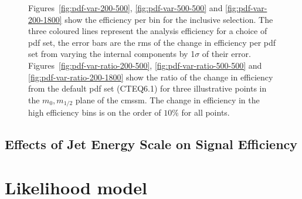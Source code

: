\begin{figure}[!h]
  \begin{center}
    \caption{Figures~\ref{fig:pdf-var-200-500}, \ref{fig:pdf-var-500-500} and 
    \ref{fig:pdf-var-200-1800} show the efficiency per \HT bin for the 
    inclusive selection. The three coloured lines represent the analysis 
    efficiency for a choice of \ac{pdf} set, the error bars are the \ac{rms} of 
    the change in efficiency per \ac{pdf} set from varying the internal 
    components by 1$\sigma$ of their error. 
    Figures~\ref{fig:pdf-var-ratio-200-500}, \ref{fig:pdf-var-ratio-500-500} 
    and \ref{fig:pdf-var-ratio-200-1800} show the ratio of the change in 
    efficiency from the default \ac{pdf} set (CTEQ6.1) for three illustrative 
    points in the $m_{0}, m_{1/2}$ plane of the \ac{cmssm}. The change in 
    efficiency in the high efficiency bins is on the order of $10\%$ for all 
    points.}
    \label{fig:pdfSummary}
  \end{center}
\end{figure}


\subsection{Effects of Jet Energy Scale on Signal Efficiency} %
\label{sub:effects_of_jet_energy_scale_on_signal_efficiency}










\section{Likelihood model} %
\label{sec:likelihood_model}


